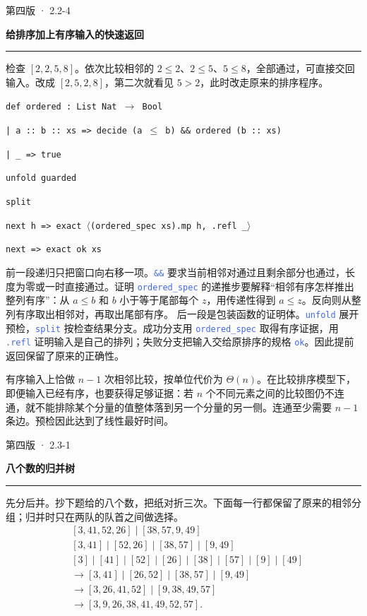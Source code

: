 \documentclass[UTF8,11pt,a4paper,fontset=fandol]{ctexart}
\newcommand{\HandoutLesson}[2]{%
  \par{\small\heiti\color{BrickRed}#1}\par\vspace{3pt}
  {\fontsize{21}{27}\selectfont\heiti\bfseries #2}\par
  \textcolor{BrickRed}{\rule{\linewidth}{.7pt}}\par}
\newcommand{\src}[1]{\textcolor{RoyalBlue}{\texttt{#1}}}
\newcommand{\subhead}[1]{\par\vspace{3pt}{\heiti\bfseries\color{RoyalBlue}#1}\par}
\newenvironment{leanblock}{\par\smallskip\noindent\begin{lrbox}{\leanbox}\begin{minipage}{\dimexpr\linewidth-12pt\relax}\raggedright\small\setlength{\parskip}{0pt}}{\end{minipage}\end{lrbox}\colorbox{RoyalBlue!6}{\usebox{\leanbox}}\par\smallskip}
\newcommand{\lineofcode}[2]{\noindent\hspace*{#1em}\strut\texttt{#2}\par}
\begin{document}
\par{}
\clearpage{}\label{p29}\HandoutLesson{第四版 · 2.2-4}{给排序加上有序输入的快速返回}
检查 $[2,2,5,8]$。依次比较相邻的 $2\le2$、$2\le5$、$5\le8$，全部通过，可直接交回输入。改成 $[2,5,2,8]$，第二次就看见 $5>2$，此时改走原来的排序程序。
\begin{leanblock}
\lineofcode{0.0}{def ordered : List Nat \ensuremath{\to} Bool}
\lineofcode{0.9}{| a :: b :: xs => decide (a \ensuremath{\leq} b) \&\& ordered (b :: xs)}
\lineofcode{0.9}{| \_ => true}
\end{leanblock}
\begin{leanblock}
\lineofcode{0.9}{unfold guarded}
\lineofcode{0.9}{split}
\lineofcode{0.9}{next h => exact \ensuremath{\langle}(ordered\_spec xs).mp h, .refl \_\ensuremath{\rangle}}
\lineofcode{0.9}{next => exact ok xs}
\end{leanblock}
前一段递归只把窗口向右移一项。\src{\&\&} 要求当前相邻对通过且剩余部分也通过，长度为零或一时直接通过。证明 \src{ordered\_spec} 的递推步要解释“相邻有序怎样推出整列有序”：从 $a\le b$ 和 $b$ 小于等于尾部每个 $z$，用传递性得到 $a\le z$。反向则从整列有序取出相邻对，再取出尾部有序。
后一段是包装函数的证明体。\src{unfold} 展开预检，\src{split} 按检查结果分支。成功分支用 \src{ordered\_spec} 取得有序证据，用 \src{.refl} 证明输入是自己的排列；失败分支把输入交给原排序的规格 \src{ok}。因此提前返回保留了原来的正确性。
\subhead{最好情形花多少}
有序输入上恰做 $n-1$ 次相邻比较，按单位代价为 $\Theta(n)$。在比较排序模型下，即便输入已经有序，也要获得足够证据：若 $n$ 个不同元素之间的比较图仍不连通，就不能排除某个分量的值整体落到另一个分量的另一侧。连通至少需要 $n-1$ 条边。预检因此达到了线性最好时间。
\par{}
\clearpage{}\label{p30}\HandoutLesson{第四版 · 2.3-1}{八个数的归并树}
先分后并。抄下题给的八个数，把纸对折三次。下面每一行都保留了原来的相邻分组；归并时只在两队的队首之间做选择。
\[
\begin{aligned}
 &[3,41,52,26]\mid[38,57,9,49]\\
 &[3,41]\mid[52,26]\mid[38,57]\mid[9,49]\\
 &[3]\mid[41]\mid[52]\mid[26]\mid[38]\mid[57]\mid[9]\mid[49]\\[2pt]
 &\longrightarrow [3,41]\mid[26,52]\mid[38,57]\mid[9,49]\\
 &\longrightarrow [3,26,41,52]\mid[9,38,49,57]\\
 &\longrightarrow [3,9,26,38,41,49,52,57].
\end{aligned}
\]
\end{document}
